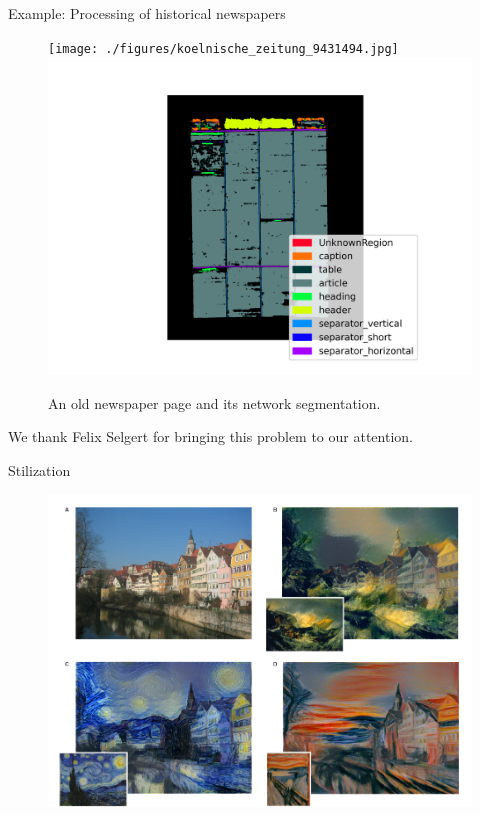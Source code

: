\documentclass{beamer}
\begin{document}
    \begin{frame}{Example: Processing of historical newspapers \cite{schultze2024chronicling}}
      \begin{figure}
        \texttt{[image: ./figures/koelnische\_zeitung\_9431494.jpg]}
        \includegraphics[scale=0.36]{./figures/segmentation_9431494.png}
      \caption{An old newspaper page and its network segmentation.}
      \end{figure}
      We thank Felix Selgert for bringing this problem to our attention.
    \end{frame}

    \begin{frame}{Stilization \cite{gatys2016image}}
      \begin{figure}
      \includegraphics[width=0.6\linewidth]{./figures/neuralstyle.png}
      \end{figure}
    \end{frame}
\end{document}
